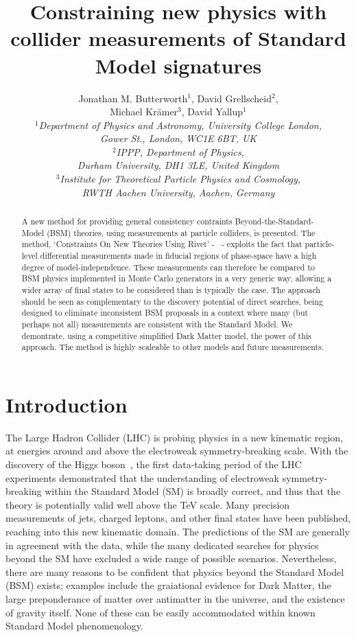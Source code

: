 \documentclass[floatfix]{article}
\title{Constraining new physics with collider measurements of Standard Model signatures}
\author{Jonathan M. Butterworth$^1$, David Grellscheid$^2$,\\ Michael Kr\"amer$^3$, David Yallup$^1$\\
\it $^1$Department of Physics and Astronomy, University College London,\\ \it Gower St., London, WC1E 6BT, UK\\
\it $^2$IPPP, Department of Physics,\\\it Durham University, DH1 3LE, United Kingdom\\ \it $^3$Institute for Theoretical Particle Physics and Cosmology, \\ \it RWTH Aachen University, Aachen, Germany}
\begin{document}
\maketitle 

\begin{abstract}
A new method for providing general consistency contraints Beyond-the-Standard-Model (BSM) theories, using 
measurements at particle colliders, is presented. The method, `Constraints On New Theories Using Rivet' - \Contur \ - exploits
the fact that particle-level differential measurements made in fiducial regions of phase-space have a high degree of
model-independence. These measurements can therefore be compared to BSM physics implemented in Monte Carlo generators in a very
generic way, allowing a wider array of final states to be considered than is typically the case. The \Contur approach should be seen
as complementary to the discovery potential of direct searches, being designed to eliminate inconsistent 
BSM proposals in a context where many (but perhaps not all) measurements are consistent with the Standard Model.
We demontrate, using a competitive simplified Dark Matter model, the power of this approach. 
The \Contur method is highly scaleable to other models and future measurements.
\end{abstract}


\section{Introduction}
\label{sec:intro}

The Large Hadron Collider (LHC) is probing physics in a new kinematic region, at energies around and above the 
electroweak symmetry-breaking scale. With the discovery of the Higgs boson~\cite{Aad:2012tfa,Chatrchyan:2012ufa}, 
the first data-taking period of the LHC experiments demonstrated that the understanding of electroweak symmetry-breaking within
the Standard Model (SM) is broadly correct, and thus that the theory is potentially valid well above the
TeV scale. Many precision measurements of jets, charged leptons, and other final states 
have been published, reaching into this new kinematic domain. The predictions of the SM are 
generally in agreement with the data, while the many dedicated searches for physics beyond the SM
have excluded a wide range of possible scenarios. Nevertheless, there are many reasons to be confident that
physics beyond the Standard Model (BSM) exists; examples include the graiational evidence for Dark Matter, the large 
preponderance of matter over antimatter in the universe, and the existence of gravity itself. None of 
these can be easily accommodated within known Standard Model phenomenology. 
\end{document}
